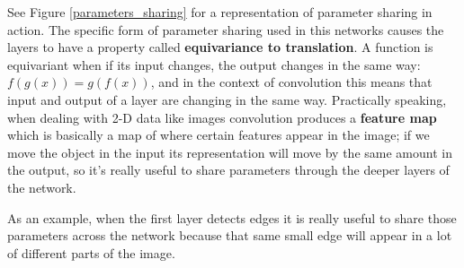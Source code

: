 \documentclass[11pt,a4paper,titlepage]{book}
\begin{document}
See Figure \ref{parameters_sharing} for a representation of parameter sharing in action.
\newline
\newline
The specific form of parameter sharing used in this networks causes the layers to have a property called \textbf{equivariance to translation}. A function is equivariant when if its input changes, the output changes in the same way: $f(g(x)) = g(f(x))$, and in the context of convolution this means that input and output of a layer are changing in the same way.
\newline
\newline
Practically speaking, when dealing with 2-D data like images convolution produces a \textbf{feature map} which is basically a map of where certain features appear in the image; if we move the object in the input its representation will move by the same amount in the output, so it's really useful to share parameters through the deeper layers of the network.

As an example, when the first layer detects edges it is really useful to share those parameters across the network because that same small edge will appear in a lot of different parts of the image.
\end{document}
